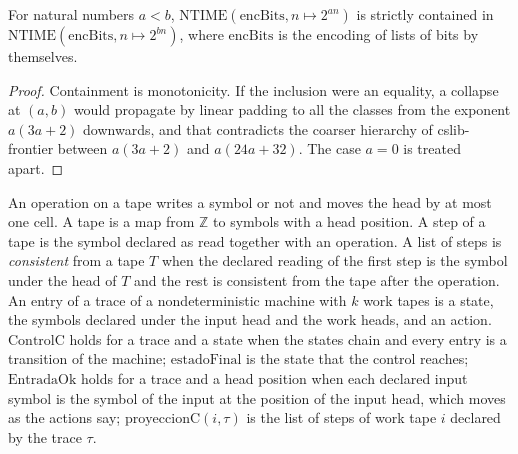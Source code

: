 \begin{theorem}
  \label{thm:machines-ntime-hierarchy}
  \leanok
  For natural numbers $a < b$, $\mathrm{NTIME}(\mathrm{encBits}, n \mapsto 2^{a n})$ is strictly contained in
  $\mathrm{NTIME}(\mathrm{encBits}, n \mapsto 2^{b n})$, where $\mathrm{encBits}$ is the encoding of lists of
  bits by themselves.
\end{theorem}

\begin{proof}
  \leanok
  Containment is monotonicity. If the inclusion were an equality, a collapse at $(a, b)$ would propagate by
  linear padding to all the classes from the exponent $a(3a + 2)$ downwards, and that contradicts the
  coarser hierarchy of cslib-frontier between $a(3a + 2)$ and $a(24a + 32)$. The case $a = 0$ is treated apart.
\end{proof}

\begin{definition}
  \label{def:machines-traces}
  \leanok
  An operation on a tape writes a symbol or not and moves the head by at most one cell. A tape is a map from
  $\mathbb{Z}$ to symbols with a head position. A step of a tape is the symbol declared as read together with an
  operation. A list of steps is \emph{consistent} from a tape $T$ when the declared reading of the first step
  is the symbol under the head of $T$ and the rest is consistent from the tape after the operation. An entry
  of a trace of a nondeterministic machine with $k$ work tapes is a state, the symbols declared under the
  input head and the work heads, and an action. $\mathrm{ControlC}$ holds for a trace and a state when the
  states chain and every entry is a transition of the machine; $\mathrm{estadoFinal}$ is the state that the
  control reaches; $\mathrm{EntradaOk}$ holds for a trace and a head position when each declared input symbol is
  the symbol of the input at the position of the input head, which moves as the actions say;
  $\mathrm{proyeccionC}(i, \tau)$ is the list of steps of work tape $i$ declared by the trace $\tau$.
  \own{}
  \infrastructure{}
\end{definition}

